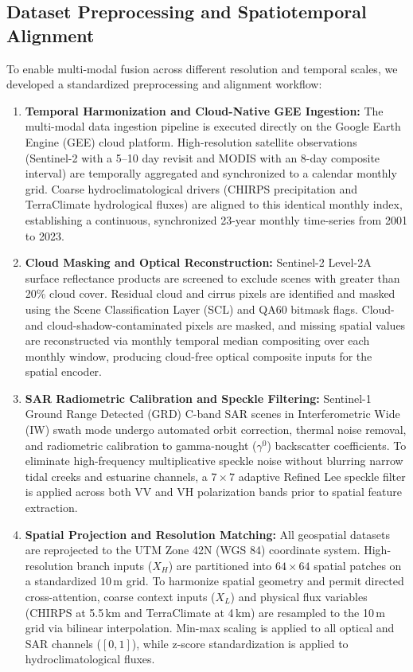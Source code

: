 \documentclass[journal]{IEEEtran}
\begin{document}
\subsection{Dataset Preprocessing and Spatiotemporal Alignment}
To enable multi-modal fusion across different resolution and temporal scales, we developed a standardized preprocessing and alignment workflow:
\begin{enumerate}
    \item \textbf{Temporal Harmonization and Cloud-Native GEE Ingestion:} The multi-modal data ingestion pipeline is executed directly on the Google Earth Engine (GEE) cloud platform. High-resolution satellite observations (Sentinel-2 with a 5--10 day revisit and MODIS with an 8-day composite interval) are temporally aggregated and synchronized to a calendar monthly grid. Coarse hydroclimatological drivers (CHIRPS precipitation and TerraClimate hydrological fluxes) are aligned to this identical monthly index, establishing a continuous, synchronized 23-year monthly time-series from 2001 to 2023.
    \item \textbf{Cloud Masking and Optical Reconstruction:} Sentinel-2 Level-2A surface reflectance products are screened to exclude scenes with greater than 20\% cloud cover. Residual cloud and cirrus pixels are identified and masked using the Scene Classification Layer (SCL) and QA60 bitmask flags. Cloud- and cloud-shadow-contaminated pixels are masked, and missing spatial values are reconstructed via monthly temporal median compositing over each monthly window, producing cloud-free optical composite inputs for the spatial encoder.
    \item \textbf{SAR Radiometric Calibration and Speckle Filtering:} Sentinel-1 Ground Range Detected (GRD) C-band SAR scenes in Interferometric Wide (IW) swath mode undergo automated orbit correction, thermal noise removal, and radiometric calibration to gamma-nought ($\gamma^0$) backscatter coefficients. To eliminate high-frequency multiplicative speckle noise without blurring narrow tidal creeks and estuarine channels, a $7 \times 7$ adaptive Refined Lee speckle filter is applied across both VV and VH polarization bands prior to spatial feature extraction.
    \item \textbf{Spatial Projection and Resolution Matching:} All geospatial datasets are reprojected to the UTM Zone 42N (WGS 84) coordinate system. High-resolution branch inputs ($X_H$) are partitioned into $64 \times 64$ spatial patches on a standardized 10\,m grid. To harmonize spatial geometry and permit directed cross-attention, coarse context inputs ($X_L$) and physical flux variables (CHIRPS at 5.5\,km and TerraClimate at 4\,km) are resampled to the 10\,m grid via bilinear interpolation. Min-max scaling is applied to all optical and SAR channels ($[0, 1]$), while z-score standardization is applied to hydroclimatological fluxes.
\end{enumerate}
\end{document}

